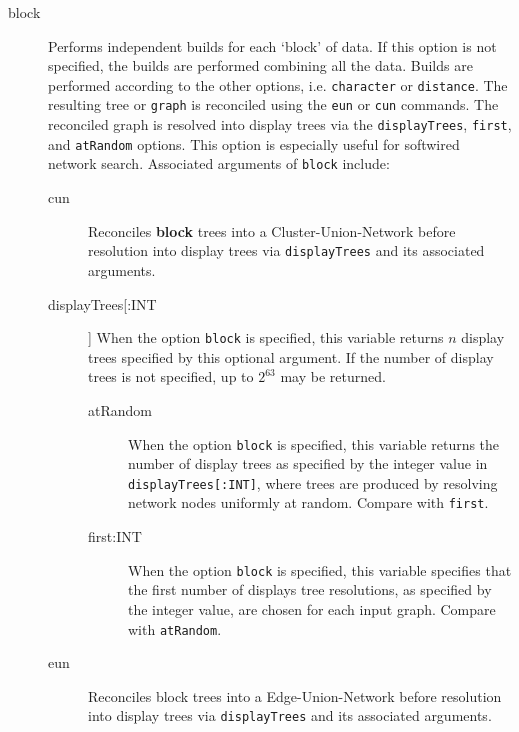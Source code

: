 	\begin{description}
	
		\item[block] Performs independent builds for each `block' of data. If this option 
		is not specified, the builds are performed combining all the data. Builds are performed 
		according 	to the other options, i.e. \texttt{character} or \texttt{distance}. The resulting 
		tree or \texttt{graph} is reconciled using the \texttt{eun} or \texttt{cun} commands. The 
		reconciled graph is resolved into display trees via the \texttt{displayTrees}, \texttt{first}, 
		and \texttt{atRandom} options. This option is especially useful for softwired network 
		search. Associated arguments of \texttt{block} include:
				
		\begin{description}
					
			\item[cun] Reconciles \textbf {block} trees into a Cluster-Union-Network 
			\citep{Baroni2005} before resolution into display trees via \texttt{displayTrees} 
			and its associated arguments.
	
			\item[displayTrees[:INT]] When the option \texttt{block} is specified, this variable 
			returns $n$ display trees specified by this optional argument. If the number of 
			display trees is not specified, up to $2^{63}$ may be returned.
				
			\begin{description}
				
				\item[atRandom] When the option \texttt{block} is specified, this variable 
				returns the number of display trees as specified by the integer value in 
				\texttt{displayTrees[:INT]}, where trees are produced by resolving network 
				nodes uniformly at random. Compare with \texttt{first}.
				
				\item[first:INT] When the option \texttt{block} is specified, this variable specifies 
				that the first number of displays tree resolutions, as specified by the integer 
				value, are chosen for each input graph. Compare with \texttt{atRandom}.
				
			\end{description}

			\item[eun] Reconciles block trees into a Edge-Union-Network \citep{MiyagiandWheeler2019, 
			Wheeler2022} before resolution into display trees via \texttt{displayTrees} and its associated 
			arguments.
						

\end{description}
\end{description}
